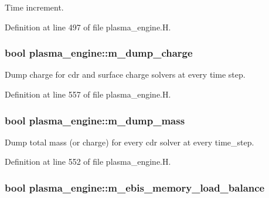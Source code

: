 Time increment. 



Definition at line 497 of file plasma\+\_\+engine.\+H.

\subsubsection[{\texorpdfstring{m\+\_\+dump\+\_\+charge}{m_dump_charge}}]{\setlength{\rightskip}{0pt plus 5cm}bool plasma\+\_\+engine\+::m\+\_\+dump\+\_\+charge\hspace{0.3cm}{\ttfamily [protected]}}\hypertarget{classplasma__engine_aaec10f075374d29e0e11b6ce051349c7}{}\label{classplasma__engine_aaec10f075374d29e0e11b6ce051349c7}


Dump charge for cdr and surface charge solvers at every time step. 



Definition at line 557 of file plasma\+\_\+engine.\+H.

\subsubsection[{\texorpdfstring{m\+\_\+dump\+\_\+mass}{m_dump_mass}}]{\setlength{\rightskip}{0pt plus 5cm}bool plasma\+\_\+engine\+::m\+\_\+dump\+\_\+mass\hspace{0.3cm}{\ttfamily [protected]}}\hypertarget{classplasma__engine_a00b0755dc18e1d98253b9cbde39bd699}{}\label{classplasma__engine_a00b0755dc18e1d98253b9cbde39bd699}


Dump total mass (or charge) for every cdr solver at every time\+\_\+step. 



Definition at line 552 of file plasma\+\_\+engine.\+H.

\subsubsection[{\texorpdfstring{m\+\_\+ebis\+\_\+memory\+\_\+load\+\_\+balance}{m_ebis_memory_load_balance}}]{\setlength{\rightskip}{0pt plus 5cm}bool plasma\+\_\+engine\+::m\+\_\+ebis\+\_\+memory\+\_\+load\+\_\+balance\hspace{0.3cm}{\ttfamily [protected]}}\hypertarget{classplasma__engine_a9072ce05c25ffeb433a1522e5d5ec97e}{}\label{classplasma__engine_a9072ce05c25ffeb433a1522e5d5ec97e}


